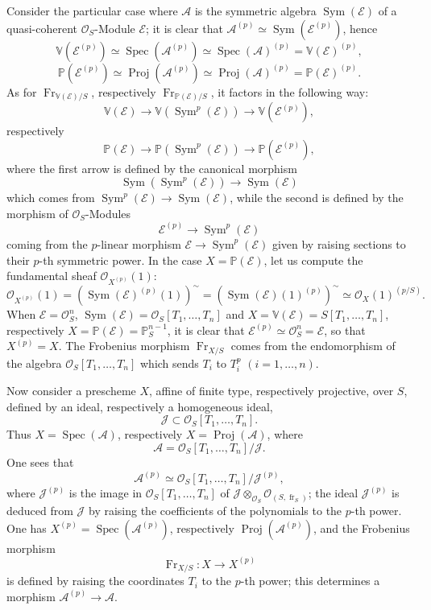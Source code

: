\documentclass[11pt]{article}
\DeclareMathOperator{\Spec}{Spec}
\providecommand{\OO}{\mathcal{O}}
\providecommand{\cE}{\mathcal E}
\providecommand{\Spec}{\operatorname{Spec}}
\providecommand{\Sym}{\operatorname{Sym}}
\providecommand{\Spec}{\operatorname{Spec}}
\providecommand{\Spec}{\operatorname{Spec}}
\providecommand{\fr}{\operatorname{fr}}
\providecommand{\Fr}{\operatorname{Fr}}
\providecommand{\Proj}{\operatorname{Proj}}
\providecommand{\Sym}{\operatorname{Sym}}
\providecommand{\JJ}{\mathcal J}
\begin{document}
Consider the particular case where $\mathcal{A}$ is the symmetric algebra $\Sym(\cE)$ of a quasi-coherent $\OO_S$-Module $\cE$; it is clear that $\mathcal{A}^{(p)}\simeq\Sym(\cE^{(p)})$, hence
\[
\mathbb V(\cE^{(p)})\simeq\Spec(\mathcal{A}^{(p)})\simeq\Spec(\mathcal{A})^{(p)}=\mathbb V(\cE)^{(p)},
\]
\[
\mathbb P(\cE^{(p)})\simeq\Proj(\mathcal{A}^{(p)})\simeq\Proj(\mathcal{A})^{(p)}=\mathbb P(\cE)^{(p)}.
\]
As for $\Fr_{\mathbb V(\cE)/S}$, respectively $\Fr_{\mathbb P(\cE)/S}$, it factors in the following way:
\[
\mathbb V(\cE)\longrightarrow \mathbb V(\Sym^p(\cE))\longrightarrow \mathbb V(\cE^{(p)}),
\]
respectively
\[
\mathbb P(\cE)\longrightarrow \mathbb P(\Sym^p(\cE))\longrightarrow \mathbb P(\cE^{(p)}),
\]
where the first arrow is defined by the canonical morphism
\[
\Sym(\Sym^p(\cE))\longrightarrow \Sym(\cE)
\]
which comes from $\Sym^p(\cE)\to\Sym(\cE)$, while the second is defined by the morphism of $\OO_S$-Modules
\[
\cE^{(p)}\longrightarrow \Sym^p(\cE)
\]
coming from the $p$-linear morphism $\cE\to\Sym^p(\cE)$ given by raising sections to their $p$-th symmetric power. In the case $X=\mathbb P(\cE)$, let us compute the fundamental sheaf $\OO_{X^{(p)}}(1)$:
\[
\OO_{X^{(p)}}(1)=(\Sym(\cE)^{(p)}(1))^{\sim}
=(\Sym(\cE)(1)^{(p)})^{\sim}
\simeq \OO_X(1)^{(p/S)}.
\]
When $\cE=\OO_S^n$, $\Sym(\cE)=\OO_S[T_1,\ldots,T_n]$ and $X=\mathbb V(\cE)=S[T_1,\ldots,T_n]$, respectively $X=\mathbb P(\cE)=\mathbb P_S^{n-1}$, it is clear that $\cE^{(p)}\simeq\OO_S^n=\cE$, so that $X^{(p)}=X$. The Frobenius morphism $\Fr_{X/S}$ comes from the endomorphism of the algebra $\OO_S[T_1,\ldots,T_n]$ which sends $T_i$ to $T_i^p$ $(i=1,\ldots,n)$.

Now consider a prescheme $X$, affine of finite type, respectively projective, over $S$, defined by an ideal, respectively a homogeneous ideal,
\[
\JJ\subset \OO_S[T_1,\ldots,T_n].
\]
Thus $X=\Spec(\mathcal{A})$, respectively $X=\Proj(\mathcal{A})$, where
\[
\mathcal{A}=\OO_S[T_1,\ldots,T_n]/\JJ.
\]
One sees that
\[
\mathcal{A}^{(p)}\simeq \OO_S[T_1,\ldots,T_n]/\JJ^{(p)},
\]
where $\JJ^{(p)}$ is the image in $\OO_S[T_1,\ldots,T_n]$ of $\JJ\otimes_{\OO_S}\OO_{(S,\fr_S)}$; the ideal $\JJ^{(p)}$ is deduced from $\JJ$ by raising the coefficients of the polynomials to the $p$-th power. One has $X^{(p)}=\Spec(\mathcal{A}^{(p)})$, respectively $\Proj(\mathcal{A}^{(p)})$, and the Frobenius morphism
\[
\Fr_{X/S}:X\longrightarrow X^{(p)}
\]
is defined by raising the coordinates $T_i$ to the $p$-th power; this determines a morphism $\mathcal{A}^{(p)}\to\mathcal{A}$.
\end{document}
